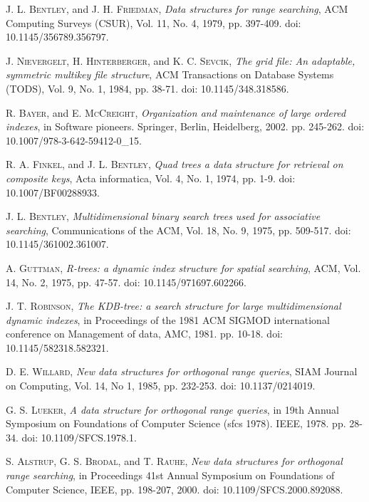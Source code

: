 \documentclass[preprint,12pt]{elsarticle}
\begin{document}
\begin{thebibliography}{00}


 \textsc{J. L. Bentley}, and \textsc{J. H. Friedman},
\textit{Data structures for range searching}, ACM Computing Surveys (CSUR), Vol. 11, No. 4, 1979, pp. 397-409. doi: 10.1145/356789.356797.

 \textsc{J. Nievergelt, H. Hinterberger}, and \textsc{K. C. Sevcik},
\textit{The grid file: An adaptable, symmetric multikey file structure}, ACM Transactions on Database Systems (TODS), Vol. 9, No. 1, 1984, pp. 38-71. doi: 10.1145/348.318586.

 \textsc{R. Bayer}, and \textsc{E. McCreight},
\textit{Organization and maintenance of large ordered indexes}, in Software pioneers. Springer, Berlin, Heidelberg, 2002. pp. 245-262. doi: 10.1007/978-3-642-59412-0\_15.

 \textsc{R. A. Finkel}, and \textsc{J. L. Bentley},
\textit{Quad trees a data structure for retrieval on composite keys}, Acta informatica, Vol. 4, No. 1, 1974, pp. 1-9. doi: 10.1007/BF00288933.

 \textsc{J. L. Bentley},
\textit{Multidimensional binary search trees used for associative searching}, Communications of the ACM, Vol. 18, No. 9, 1975, pp. 509-517. doi: 10.1145/361002.361007.

 \textsc{A. Guttman},
\textit{R-trees: a dynamic index structure for spatial searching}, ACM, Vol. 14, No. 2, 1975, pp. 47-57. doi: 10.1145/971697.602266.

 \textsc{J. T. Robinson},
\textit{The KDB-tree: a search structure for large multidimensional dynamic indexes}, in Proceedings of the 1981 ACM SIGMOD international conference on Management of data, AMC, 1981. pp. 10-18. doi: 10.1145/582318.582321.

 \textsc{D. E. Willard},
\textit{New data structures for orthogonal range queries}, SIAM Journal on Computing, Vol. 14, No 1, 1985, pp. 232-253. doi: 10.1137/0214019.

 \textsc{G. S. Lueker},
\textit{A data structure for orthogonal range queries}, in 19th Annual Symposium on Foundations of Computer Science (sfcs 1978). IEEE, 1978. pp. 28-34. doi: 10.1109/SFCS.1978.1.

 \textsc{S. Alstrup, G. S. Brodal}, and \textsc{T. Rauhe},
\textit{New data structures for orthogonal range searching}, in Proceedings 41st Annual Symposium on Foundations of Computer Science, IEEE, pp. 198-207, 2000. doi: 10.1109/SFCS.2000.892088.


\end{thebibliography}
\end{document}
